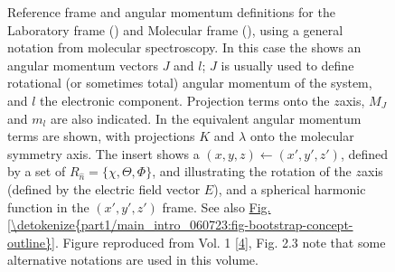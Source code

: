\documentclass[letterpaper,table,10pt,english]{jupyterBook}
\begin{document}
\begin{figure}[htbp]
\centering
\capstart

\noindent{}
\caption{Reference frame and angular momentum definitions for the Laboratory frame ({\hyperref[\detokenize{backmatter/glossary:term-LF}]{}}) and Molecular frame ({\hyperref[\detokenize{backmatter/glossary:term-MF}]{}}), using a general notation from molecular spectroscopy. In this case the {\hyperref[\detokenize{backmatter/glossary:term-LF}]{}} shows an angular momentum vectors \(J\) and \(l\); \(J\) is usually used to define rotational (or sometimes total) angular momentum of the system, and \(l\) the electronic component. Projection terms onto the {\hyperref[\detokenize{backmatter/glossary:term-LF}]{}} \(z\)\sphinxhyphen{}axis, \(M_J\) and \(m_l\) are also indicated. In the {\hyperref[\detokenize{backmatter/glossary:term-MF}]{}} equivalent angular momentum terms are shown, with projections \(K\) and \(\lambda\) onto the molecular symmetry axis. The insert shows a {\hyperref[\detokenize{backmatter/glossary:term-frame-rotation}]{}} \((x,y,z)\leftarrow(x',y',z')\), defined by a set of {\hyperref[\detokenize{backmatter/glossary:term-Euler-angles}]{}} \(R_{\hat{n}}=\{\chi,\Theta,\Phi\}\), and illustrating the rotation of the \(z\)\sphinxhyphen{}axis (defined by the electric field vector \(E\)), and a spherical harmonic function in the \((x',y',z')\) frame. See also \hyperref[\detokenize{part1/main_intro_060723:fig-bootstrap-concept-outline}]{Fig.\@ \ref{\detokenize{part1/main_intro_060723:fig-bootstrap-concept-outline}}}. Figure reproduced from  Vol. 1 {[}\hyperlink{cite.backmatter/bibliography:id677}{4}{]}, Fig. 2.3 \sphinxhyphen{} note that some alternative notations are used in this volume.}\label{\detokenize{part1/theory_tensor_formalism_160723:fig-frame-defns}}\end{figure}
\end{document}
